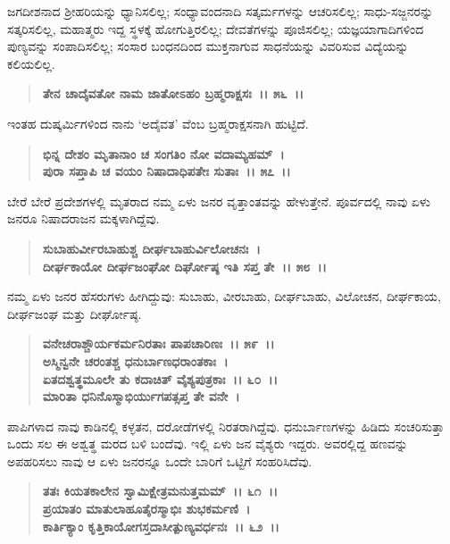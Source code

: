 ಜಗದೀಶನಾದ ಶ‍್ರೀಹರಿಯನ್ನು ಧ್ಯಾನಿಸಲಿಲ್ಲ; ಸಂಧ್ಯಾವಂದನಾದಿ ಸತ್ಕರ್ಮಗಳನ್ನು ಆಚರಿಸಲಿಲ್ಲ; ಸಾಧು-ಸಜ್ಜನರನ್ನು ಸತ್ಕರಿಸಲಿಲ್ಲ, ಮಹಾತ್ಮರು ಇದ್ದ ಸ್ಥಳಕ್ಕೆ ಹೋಗುತ್ತಿರಲಿಲ್ಲ; ದೇವತೆಗಳನ್ನು ಪೂಜಿಸಲಿಲ್ಲ; ಯಜ್ಞಯಾಗಾದಿಗಳಿಂದ ಪುಣ್ಯವನ್ನು ಸಂಪಾದಿಸಲಿಲ್ಲ; ಸಂಸಾರ ಬಂಧನದಿಂದ ಮುಕ್ತನಾಗುವ ಸಾಧನೆಯನ್ನು ವಿವರಿಸುವ ವಿದ್ಯೆಯನ್ನು ಕಲಿಯಲಿಲ್ಲ.

\begin{verse}
\textbf{ತೇನ ಚಾದೈವತೋ ನಾಮ ಜಾತೋಽಹಂ ಬ್ರಹ್ಮರಾಕ್ಷಸಃ~।। ೫೬~।।}
\end{verse}

ಇಂತಹ ದುಷ್ಕರ್ಮಿಗಳಿಂದ ನಾನು `ಅದೈವತ' ವೆಂಬ ಬ್ರಹ್ಮರಾಕ್ಷಸನಾಗಿ ಹುಟ್ಟಿದೆ.

\begin{verse}
\textbf{ಭಿನ್ನ ದೇಶಂ ಮೃತಾನಾಂ ಚ ಸಂಗತಿಂ ನೋ ವದಾಮ್ಯಹಮ್~।}\\\textbf{ಪುರಾ ಸಪ್ತಾಪಿ ಚ ವಯಂ ನಿಷಾದಾಧಿಪತೇಃ ಸುತಾಃ~।। ೫೭~।।}
\end{verse}

ಬೇರೆ ಬೇರೆ ಪ್ರದೇಶಗಳಲ್ಲಿ ಮೃತರಾದ ನಮ್ಮ ಏಳು ಜನರ ವೃತ್ತಾಂತವನ್ನು ಹೇಳುತ್ತೇನೆ. ಪೂರ್ವದಲ್ಲಿ ನಾವು ಏಳು ಜನರೂ ನಿಷಾದರಾಜನ ಮಕ್ಕಳಾಗಿದ್ದೆವು.

\begin{verse}
\textbf{ಸುಬಾಹುರ್ವೀರಬಾಹುಶ್ಚ ದೀರ್ಘಬಾಹುರ್ವಿಲೋಚನಃ~।}\\\textbf{ದೀರ್ಘಕಾಯೋ ದೀರ್ಘಜಂಘೋ ದಿರ್ಘೋಷ್ಠ ಇತಿ ಸಪ್ತ ತೇ~।। ೫೮~।।}
\end{verse}

ನಮ್ಮ ಏಳು ಜನರ ಹೆಸರುಗಳು ಹೀಗಿದ್ದುವು: ಸುಬಾಹು, ವೀರಬಾಹು, ದೀರ್ಘಬಾಹು, ವಿಲೋಚನ, ದೀರ್ಘಕಾಯ, ದೀರ್ಘಜಂಘ ಮತ್ತು ದೀರ್ಘೋಷ್ಠ.

\begin{verse}
\textbf{ವನೇಚರಾಶ್ಚೌರ್ಯಕರ್ಮನಿರತಾಃ ಪಾಪಚಾರಿಣಃ~।। ೫೯~।।}\\\textbf{ಅಸ್ಮಿನ್ವನೇ ಚರಂತಶ್ಚ ಧನುರ್ಬಾಣಧರಾಂತಕಾಃ~। }\\\textbf{ಏತದಶ್ವತ್ಥಮೂಲೇ ತು ಕದಾಚಿತ್ ವೈಶ್ಯಪುತ್ರಕಾಃ~।। ೬೦~।।} \\\textbf{ಮಾರಿತಾ ಧನಿನೊಸ್ಮಾಭಿರ್ಯುಗಪತ್ಸಪ್ತ ತೇ ವನೇ~।}
\end{verse}

ಪಾಪಿಗಳಾದ ನಾವು ಕಾಡಿನಲ್ಲಿ ಕಳ್ಳತನ, ದರೋಡೆಗಳಲ್ಲಿ ನಿರತರಾಗಿದ್ದೆವು. ಧನುರ್ಬಾಣಗಳನ್ನು ಹಿಡಿದು ಸಂಚರಿಸುತ್ತಾ ಒಂದು ಸಲ ಈ ಅಶ್ವತ್ಥ ಮರದ ಬಳಿ ಬಂದೆವು. ಇಲ್ಲಿ ಏಳು ಜನ ವೈಶ್ಯರು ಇದ್ದರು. ಅವರಲ್ಲಿದ್ದ ಹಣವನ್ನು ಅಪಹರಿಸಲು ನಾವು ಆ ಏಳು ಜನರನ್ನೂ ಒಂದೇ ಬಾರಿಗೆ ಒಟ್ಟಿಗೆ ಸಂಹರಿಸಿದೆವು.

\begin{verse}
\textbf{ತತಃ ಕಿಯತಕಾಲೇನ ಸ್ವಾಮಿಕ್ಷೇತ್ರಮನುತ್ತಮಮ್~।। ೬೧~।।}\\\textbf{ಪ್ರಯಾತಂ ಮಾತುಲಾಹೂತೈರಸ್ಮಾಭಿಃ ಶುಭಕರ್ಮಣಿ~। }\\\textbf{ಕಾರ್ತಿಕ್ಯಾಂ ಕೃತ್ತಿಕಾಯೋಗಸ್ತದಾಸೀತ್ಪುಣ್ಯವರ್ಧನಃ~।। ೬೨~।।}
\end{verse}

